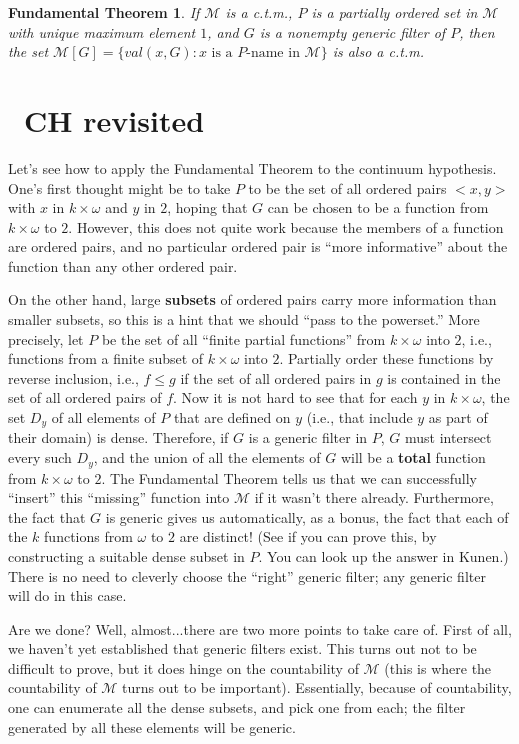 \documentclass[10pt]{article}
\newcommand\axiom[1]{\textmd{#1}}
\newtheorem*{teo}{Fundamental Theorem}
\theoremstyle{definition}
\begin{document}
\begin{teo}
If $\mathcal{M}$ is a c.t.m., $P$ is a partially ordered set in $\mathcal M$ with unique maximum element $1$, and $G$ is a nonempty generic filter of $P$, then the set $\mathcal{M}[G] = \{val(x,G) : x \text{ is a }P\text{-name in }\mathcal M\}$ is also a c.t.m.
\end{teo}

\section{\axiom{~CH} revisited}

Let's see how to apply the Fundamental Theorem to the continuum hypothesis. One's first thought might be to take $P$ to be the set of all ordered pairs $<x,y>$ with $x$ in $k \times \omega$ and $y$ in $2$, hoping that $G$ can be chosen to be a function from $k \times \omega$ to $2$. However, this does not quite work because the members of a function are ordered pairs, and no particular ordered pair is ``more informative'' about the function than any other ordered pair.

On the other hand, large \textbf{subsets} of ordered pairs carry more information than smaller subsets, so this is a hint that we should ``pass to the powerset.'' More precisely, let $P$ be the set of all ``finite partial functions'' from $k \times \omega$ into $2$, i.e., functions from a finite subset of $k \times \omega$ into $2$. Partially order these functions by reverse inclusion, i.e., $f \leq g$ if the set of all ordered pairs in $g$ is contained in the set of all ordered pairs of $f$. Now it is not hard to see that for each $y$ in $k \times \omega$, the set $D_y$ of all elements of $P$ that are defined on $y$ (i.e., that include $y$ as part of their domain) is dense. Therefore, if $G$ is a generic filter in $P$, $G$ must intersect every such $D_y$, and the union of all the elements of $G$ will be a \textbf{total} function from $k \times \omega$ to $2$. The Fundamental Theorem tells us that we can successfully ``insert'' this ``missing'' function into $\mathcal{M}$ if it wasn't there already. Furthermore, the fact that $G$ is generic gives us automatically, as a bonus, the fact that each of the $k$ functions from $\omega$ to $2$ are distinct! (See if you can prove this, by constructing a suitable dense subset in $P$. You can look up the answer in Kunen.) There is no need to cleverly choose the ``right'' generic filter; any generic filter will do in this case.

Are we done? Well, almost...there are two more points to take care of. First of all, we haven't yet established that generic filters exist. This turns out not to be difficult to prove, but it does hinge on the countability of $\mathcal{M}$ (this is where the countability of $\mathcal{M}$ turns out to be important). Essentially, because of countability, one can enumerate all the dense subsets, and pick one from each; the filter generated by all these elements will be generic.
\end{document}
